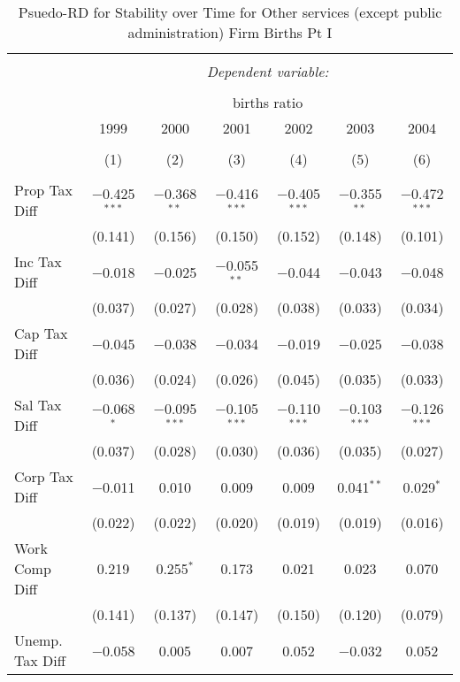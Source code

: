 
\begin{table}[!htbp] \centering 
  \caption{Psuedo-RD for Stability over Time for  Other services (except public administration) Firm Births Pt I} 
  \label{81year} 
\small 
\begin{tabular}{@{\extracolsep{5pt}}lcccccc} 
\\[-1.8ex]\hline 
\hline \\[-1.8ex] 
 & \multicolumn{6}{c}{\textit{Dependent variable:}} \\ 
\cline{2-7} 
\\[-1.8ex] & \multicolumn{6}{c}{births ratio} \\ 
 & 1999 & 2000 & 2001 & 2002 & 2003 & 2004 \\ 
\\[-1.8ex] & (1) & (2) & (3) & (4) & (5) & (6)\\ 
\hline \\[-1.8ex] 
 Prop Tax Diff & $-$0.425$^{***}$ & $-$0.368$^{**}$ & $-$0.416$^{***}$ & $-$0.405$^{***}$ & $-$0.355$^{**}$ & $-$0.472$^{***}$ \\ 
  & (0.141) & (0.156) & (0.150) & (0.152) & (0.148) & (0.101) \\ 
  Inc Tax Diff & $-$0.018 & $-$0.025 & $-$0.055$^{**}$ & $-$0.044 & $-$0.043 & $-$0.048 \\ 
  & (0.037) & (0.027) & (0.028) & (0.038) & (0.033) & (0.034) \\ 
  Cap Tax Diff & $-$0.045 & $-$0.038 & $-$0.034 & $-$0.019 & $-$0.025 & $-$0.038 \\ 
  & (0.036) & (0.024) & (0.026) & (0.045) & (0.035) & (0.033) \\ 
  Sal Tax Diff & $-$0.068$^{*}$ & $-$0.095$^{***}$ & $-$0.105$^{***}$ & $-$0.110$^{***}$ & $-$0.103$^{***}$ & $-$0.126$^{***}$ \\ 
  & (0.037) & (0.028) & (0.030) & (0.036) & (0.035) & (0.027) \\ 
  Corp Tax Diff & $-$0.011 & 0.010 & 0.009 & 0.009 & 0.041$^{**}$ & 0.029$^{*}$ \\ 
  & (0.022) & (0.022) & (0.020) & (0.019) & (0.019) & (0.016) \\ 
  Work Comp Diff & 0.219 & 0.255$^{*}$ & 0.173 & 0.021 & 0.023 & 0.070 \\ 
  & (0.141) & (0.137) & (0.147) & (0.150) & (0.120) & (0.079) \\ 
  Unemp. Tax Diff & $-$0.058 & 0.005 & 0.007 & 0.052 & $-$0.032 & 0.052 \\ 

\end{tabular}
\end{table}
